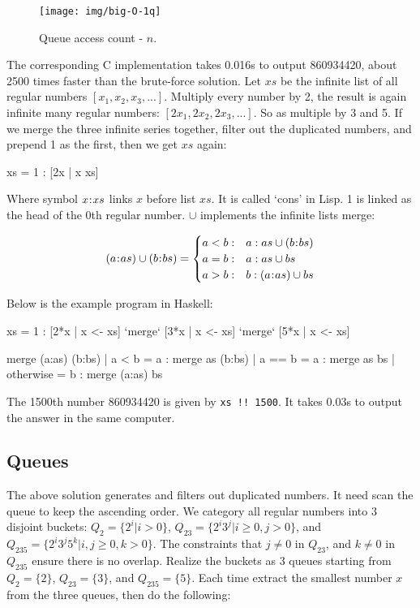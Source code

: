 \documentclass[b5paper]{article}
\begin{document}
\begin{figure}[htbp]
  \centering
  \texttt{[image: img/big-O-1q]}
  \caption{Queue access count - $n$.}
  \label{fig:big-O-1q}
\end{figure}

The corresponding C implementation takes 0.016s to output 860934420, about 2500 times faster than the brute-force solution. Let $xs$ be the infinite list of all regular numbers $[x_1, x_2, x_3, ...]$. Multiply every number by 2, the result is again infinite many regular numbers: $[2x_1, 2x_2, 2x_3, ...]$. So as multiple by 3 and 5. If we merge the three infinite series together, filter out the duplicated numbers, and prepend 1 as the first, then we get $xs$ again:

\be
  xs = 1 : [2x | x \gets xs] \cup [3x | x \gets xs] \cup [5x | x \gets xs]
\ee

Where symbol $x \mathbin{\!:\!} xs$ links $x$ before list $xs$. It is called `cons' in Lisp. 1 is linked as the head of the 0th regular number. $\cup$ implements the infinite lists merge:

\[
(a \cons as) \cup (b \cons bs) = \begin{cases}
  a < b: & a : as \cup (b \cons bs) \\
  a = b: & a : as \cup bs \\
  a > b: & b : (a \cons as) \cup bs \\
\end{cases}
\]

Below is the example program in Haskell:

\begin{Haskell}
xs = 1 : [2*x | x <- xs] `merge` [3*x | x <- xs] `merge` [5*x | x <- xs]

merge (a:as) (b:bs) | a < b = a : merge as (b:bs)
                    | a == b = a : merge as bs
                    | otherwise = b : merge (a:as) bs
\end{Haskell}

The 1500th number 860934420 is given by \texttt{xs !! 1500}. It takes 0.03s to output the answer in the same computer.

\subsection*{Queues}
The above solution generates and filters out duplicated numbers. It need scan the queue to keep the ascending order. We category all regular numbers into 3 disjoint buckets: $Q_2 = \{2^i | i > 0\}$, $Q_{23} = \{ 2^i3^j | i \geq 0, j > 0 \}$, and $Q_{235} = \{ 2^i3^j5^k | i,j \geq 0, k > 0\}$. The constraints that $j \neq 0$ in $Q_{23}$, and $k \neq 0$ in $Q_{235}$ ensure there is no overlap. Realize the buckets as 3 queues starting from $Q_2 = \{ 2 \}$, $Q_{23} = \{ 3\}$, and $Q_{235} = \{ 5 \}$. Each time extract the smallest number $x$ from the three queues, then do the following:
\end{document}

